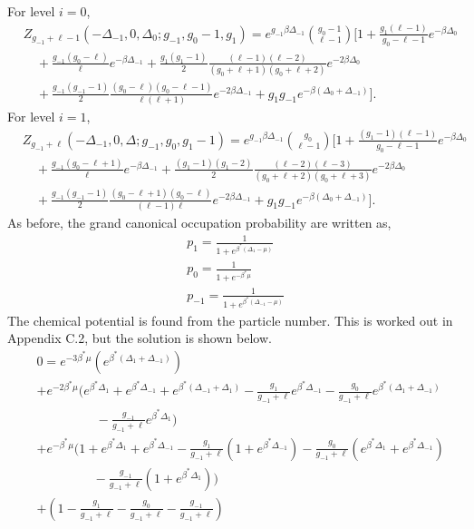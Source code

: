 For level $i=0$,
\begin{align}
    &Z_{g_{-1}+\ell-1}(-\Delta_{-1},0,\Delta_0;g_{-1},g_0-1,g_1)=e^{g_{-1}\beta\Delta_{-1}} {g_0-1\choose \ell-1} \Biggr[1+\frac{g_1 (\ell-1)}{g_0-\ell-1} e^{-\beta\Delta_0}\nonumber\\
    &\quad+\frac{g_{-1}(g_0-\ell)}{\ell} e^{-\beta\Delta_{-1}} +\frac{g_1(g_1-1)}{2} \frac{(\ell-1)(\ell-2)}{(g_0+\ell+1)(g_0+\ell+2)}e^{-2\beta\Delta_0}\nonumber\\ &\quad+\frac{g_{-1}(g_{-1}-1)}{2} \frac{(g_0-\ell)(g_0-\ell-1)}{\ell(\ell+1)} e^{-2\beta\Delta_{-1}} +g_1g_{-1}e^{-\beta(\Delta_0+\Delta_{-1})}\Biggr].
\end{align}
For level $i=1$,
\begin{align}
    &Z_{g_{-1}+\ell}(-\Delta_{-1},0,\Delta;g_{-1},g_0,g_1-1) =e^{g_{-1}\beta\Delta_{-1}} {g_0\choose \ell-1} \Biggr[1+\frac{(g_1-1) (\ell-1)}{g_0-\ell-1} e^{-\beta\Delta_0} \nonumber\\
    &\quad+\frac{g_{-1}(g_0-\ell+1)}{\ell} e^{-\beta\Delta_{-1}} +\frac{(g_1-1)(g_1-2)}{2} \frac{(\ell-2)(\ell-3)}{(g_0+\ell+2)(g_0+\ell+3)}e^{-2\beta\Delta_0}\nonumber\\ &\quad+\frac{g_{-1}(g_{-1}-1)}{2} \frac{(g_0-\ell+1)(g_0-\ell)}{(\ell-1)\ell} e^{-2\beta\Delta_{-1}} +g_1g_{-1}e^{-\beta(\Delta_0+\Delta_{-1})}\Biggr].
\end{align}
As before, the grand canonical occupation probability are written as,
\begin{gather}
    p_1=\frac{1}{1+e^{\beta^*(\Delta_1-\mu)}}\nonumber\\
    p_0=\frac{1}{1+e^{-\beta^*\mu}}\nonumber\\
    p_{-1}=\frac{1}{1+e^{\beta^*(\Delta_{-1}-\mu)}}\nonumber
\end{gather}
The chemical potential is found from the particle number. This is worked out in Appendix C.2, but the solution is shown below. 
\begin{align}
    &0=e^{-3\beta^*\mu}(e^{\beta^*(\Delta_1+\Delta_{-1})})\nonumber\\
    &+e^{-2\beta^*\mu}\Biggr(e^{\beta^*\Delta_1}+e^{\beta^*\Delta_{-1}}+e^{\beta^*(\Delta_{-1}+\Delta_1)}-\frac{g_1}{g_{-1}+\ell}e^{\beta^*\Delta_{-1}}\nonumber-\frac{g_0}{g_{-1}+\ell}e^{\beta^*(\Delta_1+\Delta_{-1})}\nonumber\\
    &\quad\quad\quad\quad\ \ \ -\frac{g_{-1}}{g_{-1}+\ell}e^{\beta^*\Delta_1}\Biggr)\nonumber\\
    &+e^{-\beta^*\mu}\Biggr(1+e^{\beta^*\Delta_1}+e^{\beta^*\Delta_{-1}}-\frac{g_1}{g_{-1}+\ell}(1+e^{\beta^*\Delta_{-1}})-\frac{g_0}{g_{-1}+\ell}(e^{\beta^*\Delta_1}+e^{\beta^*\Delta_{-1}})\nonumber\\
    &\quad\quad\quad\quad\ \ -\frac{g_{-1}}{g_{-1}+\ell}(1+e^{\beta^*\Delta_1})\Biggr)\nonumber\\
    & +(1-\frac{g_1}{g_{-1}+\ell}-\frac{g_0}{g_{-1}+\ell}-\frac{g_{-1}}{g_{-1}+\ell})
\end{align}
